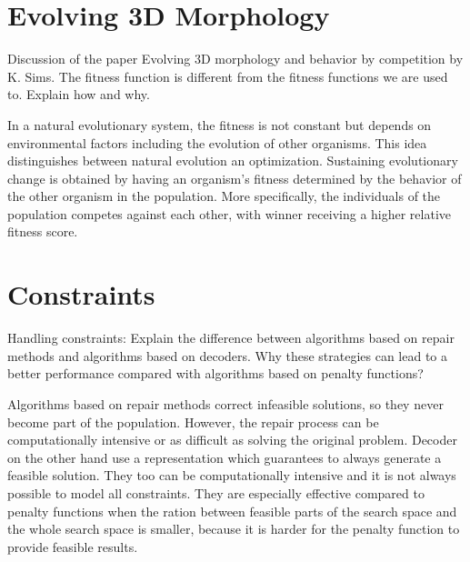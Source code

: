 \documentclass[../main.tex]{subfiles}
\begin{document}
\section{Evolving 3D Morphology}
\begin{question}
Discussion of the paper Evolving 3D morphology and behavior by competition by K. Sims. The fitness function is
different from the fitness functions we are used to. Explain how and why.
\end{question}
\begin{solution}
In a natural evolutionary system, the fitness is not constant but depends on environmental factors including the
evolution of other organisms. This idea distinguishes between natural evolution an optimization. Sustaining
evolutionary change is obtained by having an organism's fitness determined by the behavior of the other organism in the
population. More specifically, the individuals of the population competes against each other, with winner receiving a
higher relative fitness score.
\end{solution}

\section{Constraints}
\begin{question}
Handling constraints: Explain the difference between algorithms based on repair methods and algorithms based on
decoders. Why these strategies can lead to a better performance compared with algorithms based on penalty functions?
\end{question}
\begin{solution}
Algorithms based on repair methods correct infeasible solutions, so they never become part of the population. However,
the repair process can be computationally intensive or as difficult as solving the original problem. Decoder on the
other hand use a representation which guarantees to always generate a feasible solution. They too can be
computationally intensive and it is not always possible to model all constraints. They are especially effective
compared to penalty functions when the ration between feasible parts of the search space and the whole search space is
smaller, because it is harder for the penalty function to provide feasible results.
\end{solution}
\end{document}
